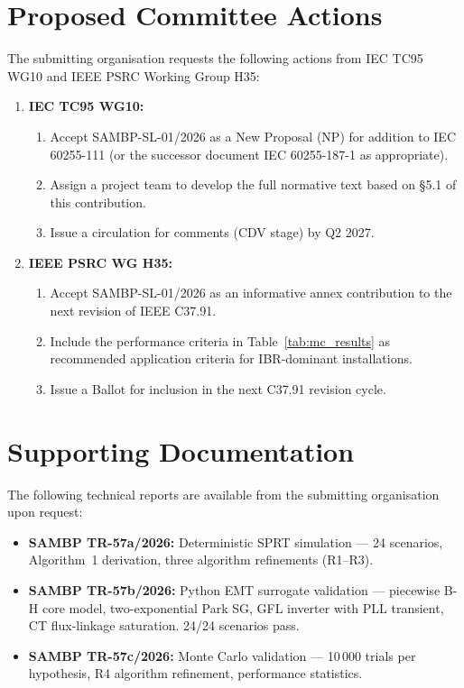 \documentclass[11pt, a4paper]{article}
\begin{document}
\section{Proposed Committee Actions}

The submitting organisation requests the following actions from
IEC TC95 WG10 and IEEE PSRC Working Group H35:

\begin{enumerate}
  \item \textbf{IEC TC95 WG10:}
  \begin{enumerate}[label=(\alph*)]
    \item Accept SAMBP-SL-01/2026 as a New Proposal (NP) for addition to
      IEC 60255-111 (or the successor document IEC 60255-187-1 as
      appropriate).
    \item Assign a project team to develop the full normative text based on
      §5.1 of this contribution.
    \item Issue a circulation for comments (CDV stage) by Q2 2027.
  \end{enumerate}
  \item \textbf{IEEE PSRC WG H35:}
  \begin{enumerate}[label=(\alph*)]
    \item Accept SAMBP-SL-01/2026 as an informative annex contribution to
      the next revision of IEEE C37.91.
    \item Include the performance criteria in Table~\ref{tab:mc_results} as
      recommended application criteria for IBR-dominant installations.
    \item Issue a Ballot for inclusion in the next C37.91 revision cycle.
  \end{enumerate}
\end{enumerate}

\section{Supporting Documentation}

The following technical reports are available from the submitting organisation
upon request:

\begin{itemize}
  \item \textbf{SAMBP TR-57a/2026:}  Deterministic SPRT simulation — 24
    scenarios, Algorithm~1 derivation, three algorithm refinements (R1–R3).
  \item \textbf{SAMBP TR-57b/2026:}  Python EMT surrogate validation —
    piecewise B-H core model, two-exponential Park SG, GFL inverter with
    PLL transient, CT flux-linkage saturation.  24/24 scenarios pass.
  \item \textbf{SAMBP TR-57c/2026:}  Monte Carlo validation — 10\,000 trials
    per hypothesis, R4 algorithm refinement, performance statistics.
\end{itemize}
\end{document}
